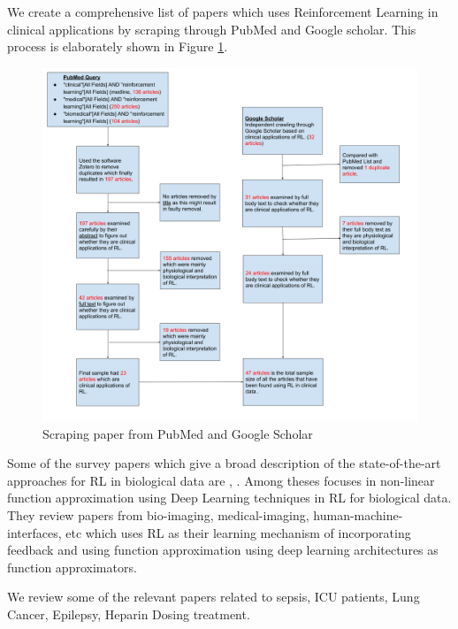 We create a comprehensive list of papers which uses Reinforcement Learning in clinical applications by scraping through PubMed and Google scholar. This process is elaborately shown in Figure \ref{Fig:listofpapers}.

\begin{figure}[!th]
\center
\includegraphics[scale=0.3]{img/ListofPapers.png}
\caption{Scraping paper from PubMed and Google Scholar}
\label{Fig:listofpapers}
\end{figure}

Some of the survey papers which give a broad description of the state-of-the-art approaches for RL in biological data are \citet{mahmud2018applications}, \citet{kappor2018current}. Among theses \citet{mahmud2018applications} focuses in non-linear function approximation using Deep Learning techniques in RL for biological data. They review papers from bio-imaging, medical-imaging, human-machine-interfaces, etc which uses RL as their learning mechanism of incorporating feedback and using function approximation using deep learning architectures as function approximators.

We review some of the relevant papers related to sepsis, ICU patients, Lung Cancer, Epilepsy, Heparin Dosing treatment.

